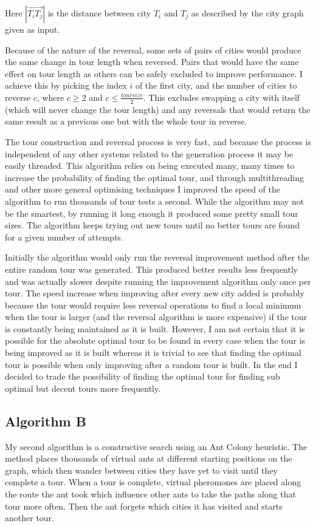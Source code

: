 \documentclass[a4paper,11pt]{article}
\begin{document}
\noindent
Here $|\overrightarrow{{T_i}{T_j}}|$ is the distance between city $T_i$ and
$T_j$ as described by the city graph given as input.

Because of the nature of the reversal, some sets of pairs of cities would 
produce the same change in tour length when reversed. Pairs that would have
the same effect on tour length as others can be safely excluded to improve 
performance. I achieve this by picking the index $i$ of the first city, and the 
number of cities to reverse $c$, where $c \ge 2$ and
$c \le \frac{toursize}{2}$. This excludes swapping a city with itself (which
will never change the tour length) and any reversals that would return the same 
result as a previous one but with the whole tour in reverse.

The tour construction and reversal process is very fast, and because the
process is independent of any other systems related to the generation process
it may be easily threaded. This algorithm relies on being executed many, many
times to increase the probability of finding the optimal tour, and through
multithreading and other more general optimising techniques I improved the
speed of the algorithm to run thousands of tour tests a second. While the
algorithm may not be the smartest, by running it long enough it produced some
pretty small tour sizes. The algorithm keeps trying out new tours until no
better tours are found for a given number of attempts.

Initially the algorithm would only run the reversal improvement method after
the entire random tour was generated. This produced better results less
frequently and was actually slower despite running the improvement algorithm
only once per tour. The speed increase when improving after every new city
added is probably because the tour would require less reversal operations to
find a local minimum when the tour is larger (and the reversal algorithm is more
expensive) if the tour is constantly being maintained as it is built. However,
I am not certain that it is possible for the absolute optimal tour to be found
in every case when the tour is being improved as it is built whereas it is
trivial to see that finding the optimal tour is possible when only improving
after a random tour is built. In the end I decided to trade the possibility of
finding the optimal tour for finding sub optimal but decent tours more
frequently.

\subsection{Algorithm B}
My second algorithm is a constructive search using an Ant Colony heuristic.
The method places thousands of virtual ants at different starting positions on
the graph, which then wander between cities they have yet to visit until they
complete a tour. When a tour is complete, virtual pheromones are placed along
the route the ant took which influence other ants to take the paths along that
tour more often. Then the ant forgets which cities it has visited and starts
another tour.
\end{document}
